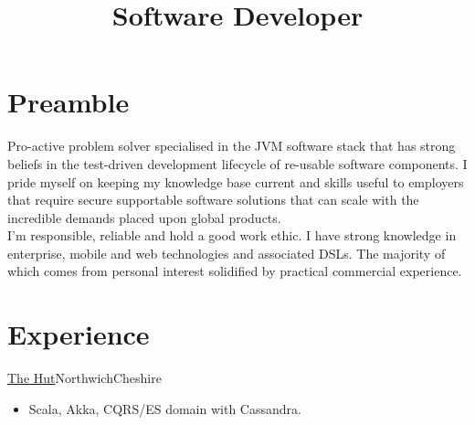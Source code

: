 \documentclass[a4paper,10pt]{moderncv}
\title{Software Developer}
\newcommand\weblink[2] {{\color{href} \href{#1}{#2}}}
\begin{document}
\maketitle

\section{Preamble}
Pro-active problem solver specialised in the JVM software stack that has strong beliefs in the test-driven development lifecycle of re-usable software components.
I pride myself on keeping my knowledge base current and skills useful to employers that require secure supportable software solutions that can scale with the incredible demands placed upon global products.\\

I'm responsible, reliable and hold a good work ethic.
I have strong knowledge in enterprise, mobile and web technologies and associated DSLs. The majority of which comes from personal interest solidified by practical commercial experience.

\section{Experience}

{\weblink{http://www.thehutgroup.com}{The Hut}}{Northwich}{Cheshire}{
\begin{itemize}
  \item Scala, Akka, CQRS/ES domain with Cassandra.
\end{itemize}
}
\end{document}
